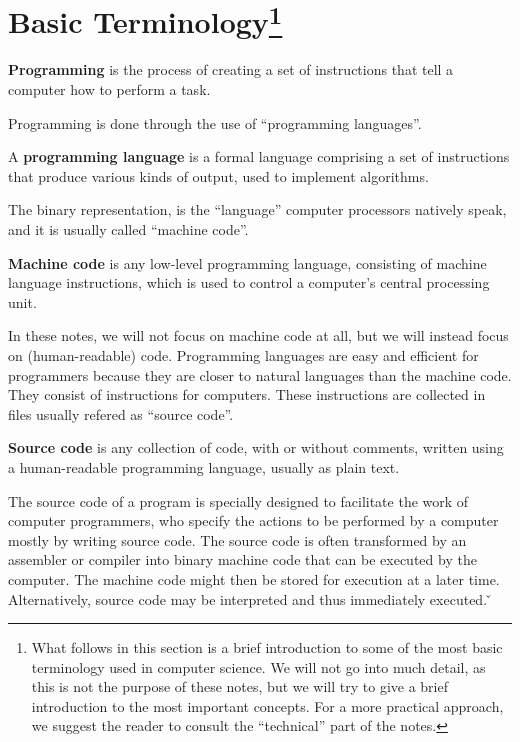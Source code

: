 
\section[Basic Terminology] {Basic Terminology\footnote{What follows in this section is a brief introduction to some of the most basic terminology used in computer science.
We will not go into much detail, as this is not the purpose of these notes, but we will try to give a brief
introduction to the most important concepts. For a more practical approach, we suggest the reader to consult the
``technical'' part of the notes.}}

\bd[Programming]
\textbf{Programming} is the process of creating a set of instructions that tell a computer how to perform a task.
\ed

Programming is done through the use of ``programming languages''.

A \textbf{programming language} is a formal language comprising a set of instructions that produce various kinds of
output, used to implement algorithms.
\ed

The binary representation, is the ``language'' computer processors natively speak, and it is usually called ``machine
code''.

\textbf{Machine code} is any low-level programming language, consisting of machine language instructions, which is
used to control a computer's central processing unit.
\ed

In these notes, we will not focus on machine code at all, but we will instead focus on (human-readable) code.
Programming languages are easy and efficient for programmers because they are closer to natural languages than the
machine code. They consist of instructions for computers. These instructions are collected in files usually refered
as ``source code''.

\textbf{Source code} is any collection of code, with or without comments, written using a human-readable programming
language, usually as plain text.
\ed

The source code of a program is specially designed to facilitate the work of computer programmers, who specify the
actions to be performed by a computer mostly by writing source code. The source code is often transformed by an
assembler or compiler into binary machine code that can be executed by the computer. The machine code might then be
stored for execution at a later time. Alternatively, source code may be interpreted and thus immediately executed. \v

